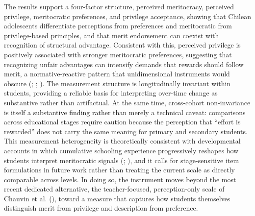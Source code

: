 \documentclass[
  13pt,
]{article}
\begin{document}
The results support a four-factor structure, perceived meritocracy,
perceived privilege, meritocratic preferences, and privilege acceptance,
showing that Chilean adolescents differentiate perceptions from
preferences and meritocratic from privilege-based principles, and that
merit endorsement can coexist with recognition of structural advantage.
Consistent with this, perceived privilege is positively associated with
stronger meritocratic preferences, suggesting that recognizing unfair
advantages can intensify demands that rewards should follow merit, a
normative-reactive pattern that unidimensional instruments would obscure
(;
;
). The
measurement structure is longitudinally invariant within students,
providing a reliable basis for interpreting over-time change as
substantive rather than artifactual. At the same time, cross-cohort
non-invariance is itself a substantive finding rather than merely a
technical caveat: comparisons across educational stages require caution
because the perception that ``effort is rewarded'' does not carry the
same meaning for primary and secondary students. This measurement
heterogeneity is theoretically consistent with developmental accounts in
which cumulative schooling experience progressively reshapes how
students interpret meritocratic signals
(;
), and it calls
for stage-sensitive item formulations in future work rather than
treating the current scale as directly comparable across levels. In
doing so, the instrument moves beyond the most recent dedicated
alternative, the teacher-focused, perception-only scale of Chauvin et
al. (), toward a measure that
captures how students themselves distinguish merit from privilege and
description from preference.
\end{document}
